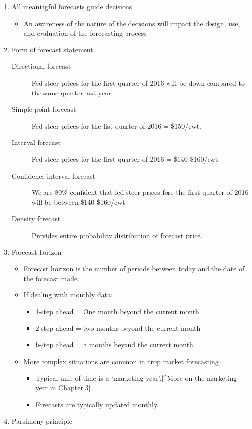 \documentclass[
  letterpaper,
  DIV=11,
  numbers=noendperiod]{scrreprt}
\providecommand{\tightlist}{%
  \setlength{\itemsep}{0pt}\setlength{\parskip}{0pt}}\usepackage{longtable,booktabs,array}
\begin{document}
\begin{enumerate}
\def\labelenumi{\arabic{enumi}.}
\item
  All meaningful forecasts guide decisions

  \begin{itemize}
  \tightlist
  \item
    An awareness of the nature of the decisions will impact the design,
    use, and evaluation of the forecasting process
  \end{itemize}
\item
  Form of forecast statement

  \begin{description}
  \item[Directional forecast]
  Fed steer prices for the first quarter of 2016 will be down compared
  to the same quarter last year.
  \item[Simple point forecast]
  Fed steer prices for the fist quarter of 2016 = \$150/cwt.
  \item[Interval forecast]
  Fed steer prices for the first quarter of 2016 = \$140-\$160/cwt
  \item[Confidence interval forecast]
  We are 80\% confident that fed steer prices fore the first quarter of
  2016 will be between \$140-\$160/cwt
  \item[Density forecast]
  Provides entire probability distribution of forecast price.
  \end{description}
\item
  Forecast horizon

  \begin{itemize}
  \item
    Forecast horizon is the number of periods between today and the date
    of the forecast made.
  \item
    If dealing with monthly data:

    \begin{itemize}
    \tightlist
    \item
      1-step ahead = One month beyond the current month
    \item
      2-step ahead = two months beyond the current month
    \item
      \texttt{h}-step ahead = \texttt{h} months beyond the current month
    \end{itemize}
  \item
    More complex situations are common in crop market forecasting

    \begin{itemize}
    \tightlist
    \item
      Typical unit of time is a `marketing year'.{[}\^{}More on the
      marketing year in Chapter 3{]}
    \item
      Forecasts are typically updated monthly.
    \end{itemize}
  \end{itemize}
\item
  Parsimony principle


\end{enumerate}
\end{document}
